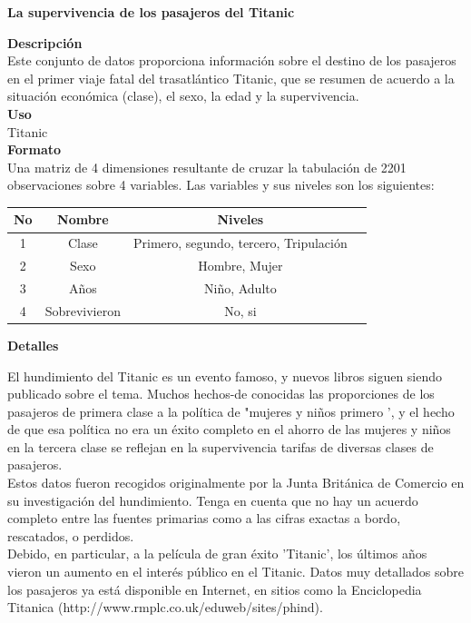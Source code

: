 \documentclass[a4paper]{article}
\begin{document}
\begin{center}
\LARGE{\textbf{La supervivencia de los pasajeros del Titanic}}
\end{center}

\textbf{Descripción}
\\
Este conjunto de datos proporciona información sobre el destino de los pasajeros en el primer viaje fatal del trasatlántico Titanic, que se resumen de acuerdo a la situación económica (clase), el sexo, la edad y la supervivencia.\\

\textbf{Uso}
\\
Titanic\\

\textbf{Formato}
\\
Una matriz de 4 dimensiones resultante de cruzar la tabulación de 2201 observaciones sobre 4 variables. Las variables y sus niveles son los siguientes:

\begin{table}[H]
\centering
\begin{tabular}{ | c | c | c | c | }
  \hline
  No & Nombre & Niveles\\
  \hline
  1	& Clase &	Primero, segundo, tercero, Tripulación\\
  \hline 
  2 & Sexo & Hombre, Mujer\\
  \hline 
  3 & Años & Niño, Adulto\\
  \hline
  4 & Sobrevivieron & No, si\\
  \hline
\end{tabular}
\end{table}

\textbf{Detalles}

El hundimiento del Titanic es un evento famoso, y nuevos libros siguen siendo publicado sobre el tema. Muchos hechos-de conocidas las proporciones de los pasajeros de primera clase a la política de "mujeres y niños primero ', y el hecho de que esa política no era un éxito completo en el ahorro de las mujeres y niños en la tercera clase se reflejan en la supervivencia tarifas de diversas clases de pasajeros.\\

Estos datos fueron recogidos originalmente por la Junta Británica de Comercio en su investigación del hundimiento. Tenga en cuenta que no hay un acuerdo completo entre las fuentes primarias como a las cifras exactas a bordo, rescatados, o perdidos.\\

Debido, en particular, a la película de gran éxito 'Titanic', los últimos años vieron un aumento en el interés público en el Titanic. Datos muy detallados sobre los pasajeros ya está disponible en Internet, en sitios como la Enciclopedia Titanica (http://www.rmplc.co.uk/eduweb/sites/phind).\\
\end{document}

